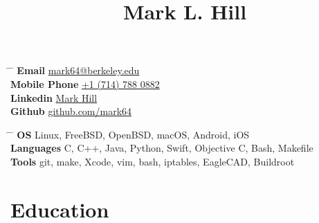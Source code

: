 \documentclass[10pt]{article} %
\begin{document}

\title{Mark L. Hill} %


\parbox{0.5\textwidth}{ %
\begin{tabbing} %
\hspace{3cm} \= \hspace{4cm} \= \kill %
{\bf Email} \> \href{mailto:mark64@berkeley.edu}{mark64@berkeley.edu} \\ %
{\bf Mobile Phone} \> \href{tel:+17147880882}{+1 (714) 788 0882} \\ %
{\bf Linkedin} \> \href{https://www.linkedin.com/in/mark-h-6ab768146}{Mark Hill} \\ %
{\bf Github} \> \href{https://github.com/mark64} {github.com/mark64} \\ %
\end{tabbing}}
\hfill %
\parbox{0.5\textwidth}{ %
\begin{tabbing} %
\hspace{3cm} \= \hspace{4cm} \= \kill %
{\bf OS} \> Linux, FreeBSD, OpenBSD, macOS, Android, iOS \\
{\bf Languages} \> C, C++, Java, Python, Swift, Objective C, Bash, Makefile \\
{\bf Tools} \> git, make, Xcode, vim, bash, iptables, EagleCAD, Buildroot \\
\end{tabbing}}



\section{Education}

\end{document}

